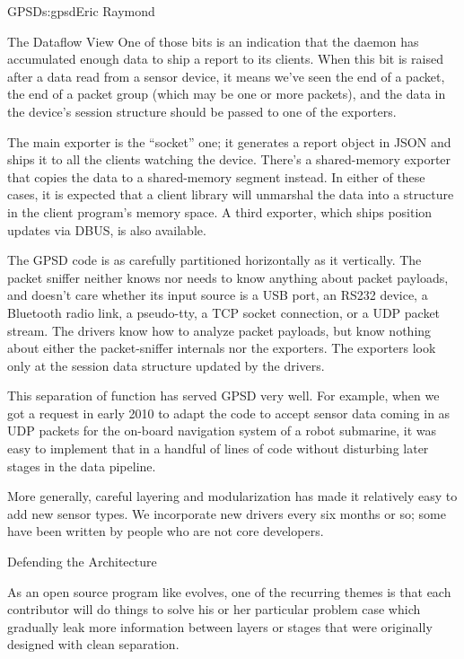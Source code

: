 \begin{aosachapter}{GPSD}{s:gpsd}{Eric Raymond}
\begin{aosasect1}{The Dataflow View}
One of those bits is an indication that the daemon has accumulated
enough data to ship a report to its clients.  When this bit is raised
after a data read from a sensor device, it means we've seen the end of
a packet, the end of a packet group (which may be one or more
packets), and the data in the device's session structure should be
passed to one of the exporters.

The main exporter is the ``socket'' one; it generates a report object
in JSON and ships it to all the clients watching the device. There's a
shared-memory exporter that copies the data to a shared-memory segment
instead. In either of these cases, it is expected that a client
library will unmarshal the data into a structure in the client
program's memory space.  A third exporter, which ships position
updates via DBUS, is also available.

The GPSD code is as carefully partitioned horizontally as it
vertically.  The packet sniffer neither knows nor needs to know
anything about packet payloads, and doesn't care whether its input
source is a USB port, an RS232 device, a Bluetooth radio link, a
pseudo-tty, a TCP socket connection, or a UDP packet stream.  The
drivers know how to analyze packet payloads, but know nothing about
either the packet-sniffer internals nor the exporters.  The exporters
look only at the session data structure updated by the drivers.

This separation of function has served GPSD very well. For example,
when we got a request in early 2010 to adapt the code to accept sensor
data coming in as UDP packets for the on-board navigation system of a
robot submarine, it was easy to implement that in a handful of lines
of code without disturbing later stages in the data pipeline.

More generally, careful layering and modularization has made it
relatively easy to add new sensor types.  We incorporate new drivers
every six months or so; some have been written by people who are not
core developers.

\end{aosasect1}

\begin{aosasect1}{Defending the Architecture}

As an open source program like  evolves, one of the
recurring themes is that each contributor will do things to solve his or
her particular problem case which gradually leak more information
between layers or stages that were originally designed with clean
separation.


\end{aosasect1}
\end{aosachapter}
